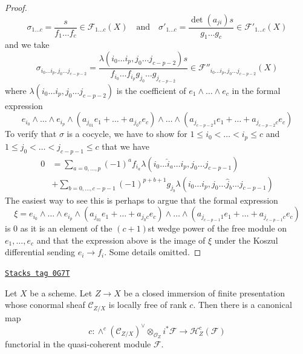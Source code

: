 \begin{proof}
$$
\sigma_{1 \ldots c} = \frac{s}{f_1 \ldots f_c} \in \mathcal{F}_{1 \ldots c}(X)
\quad\text{and}\quad
\sigma'_{1 \ldots c} = \frac{\det(a_{ji})s}{g_1 \ldots g_c} \in
\mathcal{F}'_{1 \ldots c}(X)
$$
and we take
$$
\sigma_{i_0 \ldots i_p, j_0 \ldots j_{c - p - 2}} =
\frac{\lambda(i_0 \ldots i_p, j_0 \ldots j_{c - p - 2})s}%
{f_{i_0} \ldots f_{i_p}g_{j_0} \ldots g_{j_{c - p - 2}}}
\in \mathcal{F}''_{i_0 \ldots i_p, j_0 \ldots j_{c - p - 2}}(X)
$$
where $\lambda(i_0 \ldots i_p, j_0 \ldots j_{c - p - 2})$
is the coefficient of $e_1 \wedge \ldots \wedge e_c$ in
the formal expression
$$
e_{i_0} \wedge \ldots \wedge e_{i_p} \wedge
(a_{j_01} e_1 + \ldots + a_{j_0c}e_c) \wedge \ldots \wedge
(a_{j_{c - p - 2}1} e_1 + \ldots + a_{j_{c - p - 2}c}e_c)
$$
To verify that $\sigma$ is a cocycle, we have to show for
$1 \leq i_0 < \ldots < i_p \leq c$ and
$1 \leq j_0 < \ldots < j_{c - p - 1} \leq c$
that we have
\begin{align*}
0 & =
\sum\nolimits_{a = 0, \ldots, p} (-1)^a
f_{i_a} \lambda(i_0 \ldots \hat i_a \ldots i_p, j_0 \ldots j_{c - p - 1}) \\
& +
\sum\nolimits_{b = 0, \ldots, c - p - 1} (-1)^{p + b + 1}g_{j_b}
\lambda(i_0 \ldots i_p, j_0 \ldots \hat j_b \ldots j_{c - p - 1})
\end{align*}
The easiest way to see this is perhaps to argue that the formal expression
$$
\xi = e_{i_0} \wedge \ldots \wedge e_{i_p} \wedge
(a_{j_01} e_1 + \ldots + a_{j_0c}e_c) \wedge \ldots \wedge
(a_{j_{c - p - 1}1} e_1 + \ldots + a_{j_{c - p - 1}c}e_c)
$$
is $0$ as it is an element of the $(c + 1)$st wedge power of the free module
on $e_1, \ldots, e_c$ and that the expression above is the image of
$\xi$ under the Koszul differential sending $e_i \to f_i$. Some details
omitted.
\end{proof}

\begin{lemma}
\label{perfect-lemma-supported-map-global}
\href{https://stacks.math.columbia.edu/tag/0G7T}{\texttt{Stacks tag 0G7T}}

Let $X$ be a scheme. Let $Z \to X$ be a closed immersion of finite presentation
whose conormal sheaf $\mathcal{C}_{Z/X}$ is locally free of rank $c$.
Then there is a canonical map
$$
c :
\wedge^c(\mathcal{C}_{Z/X})^\vee \otimes_{\mathcal{O}_Z} i^*\mathcal{F}
\longrightarrow
\mathcal{H}_Z^c(\mathcal{F})
$$
functorial in the quasi-coherent module $\mathcal{F}$.
\end{lemma}

